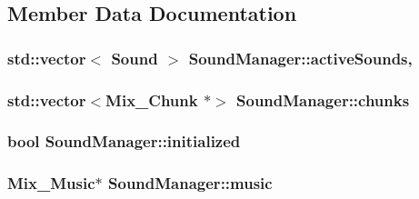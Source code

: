 \subsection{Member Data Documentation}
\hypertarget{classSoundManager_a31f26ed9971efa0d30d57cdd2b60854f}{
\subsubsection[{active\-Sounds}]{\setlength{\rightskip}{0pt plus 5cm}std\-::vector$<$ {\bf Sound} $>$ Sound\-Manager\-::active\-Sounds\hspace{0.3cm}{\ttfamily [static]}, {\ttfamily [private]}}}\label{classSoundManager_a31f26ed9971efa0d30d57cdd2b60854f}
\hypertarget{classSoundManager_a591ec09cf6486bc6ff62c458b1718630}{
\subsubsection[{chunks}]{\setlength{\rightskip}{0pt plus 5cm}std\-::vector$<$Mix\-\_\-\-Chunk $\ast$$>$ Sound\-Manager\-::chunks\hspace{0.3cm}{\ttfamily [private]}}}\label{classSoundManager_a591ec09cf6486bc6ff62c458b1718630}
\hypertarget{classSoundManager_a4d95e056b1fe09c91fc601e8062b9b9b}{
\subsubsection[{initialized}]{\setlength{\rightskip}{0pt plus 5cm}bool Sound\-Manager\-::initialized\hspace{0.3cm}{\ttfamily [private]}}}\label{classSoundManager_a4d95e056b1fe09c91fc601e8062b9b9b}
\hypertarget{classSoundManager_add68d7295ec04f3d1fb351199ef943a3}{
\subsubsection[{music}]{\setlength{\rightskip}{0pt plus 5cm}Mix\-\_\-\-Music$\ast$ Sound\-Manager\-::music\hspace{0.3cm}{\ttfamily [private]}}}\label{classSoundManager_add68d7295ec04f3d1fb351199ef943a3}
